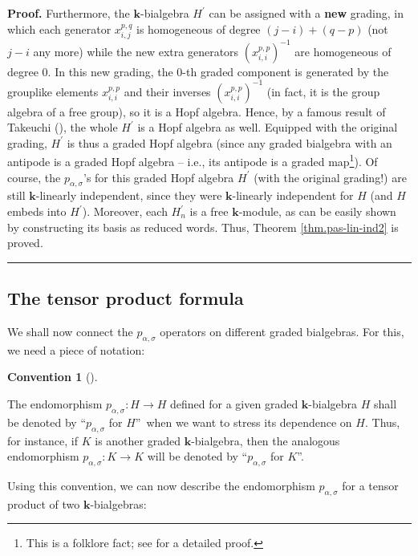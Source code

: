 \documentclass[numbers=enddot,12pt,final,onecolumn,notitlepage]{scrartcl}%
\theoremstyle{definition}
\newtheorem{conv}[theo]{Convention}
\newenvironment{convention}[1][]
{\begin{conv}[#1]\begin{leftbar}}
{\end{leftbar}\end{conv}}
\newenvironment{proof}[1][Proof]{\noindent\textbf{#1.} }{\ \rule{0.5em}{0.5em}}
\begin{document}
\begin{proof}
Furthermore, the $\mathbf{k}$-bialgebra $H^{\prime}$ can be assigned with a
\textbf{new} grading, in which each generator $x_{i,j}^{p,q}$ is homogeneous
of degree $\left(  j-i\right)  +\left(  q-p\right)  $ (not $j-i$ any more)
while the new extra generators $\left(  x_{i,i}^{p,p}\right)  ^{-1}$ are
homogeneous of degree $0$. In this new grading, the $0$-th graded component is
generated by the grouplike elements $x_{i,i}^{p,p}$ and their inverses
$\left(  x_{i,i}^{p,p}\right)  ^{-1}$ (in fact, it is the group algebra of a
free group), so it is a Hopf algebra. Hence, by a famous result of Takeuchi
(\cite[Exercise 1.4.34 (b)]{GriRei}), the whole $H^{\prime}$ is a Hopf algebra
as well. Equipped with the original grading, $H^{\prime}$ is thus a graded
Hopf algebra (since any graded bialgebra with an antipode is a graded Hopf
algebra -- i.e., its antipode is a graded map\footnote{This is a folklore
fact; see \cite[Theorem 23.2]{logid} for a detailed proof.}). Of course, the
$p_{\alpha,\sigma}$'s for this graded Hopf algebra $H^{\prime}$ (with the
original grading!) are still $\mathbf{k}$-linearly independent, since they
were $\mathbf{k}$-linearly independent for $H$ (and $H$ embeds into
$H^{\prime}$). Moreover, each $H_{n}^{\prime}$ is a free $\mathbf{k}$-module,
as can be easily shown by constructing its basis as reduced words. Thus,
Theorem \ref{thm.pas-lin-ind2} is proved.
\end{proof}

\subsection{The tensor product formula}

We shall now connect the $p_{\alpha,\sigma}$ operators on different graded
bialgebras. For this, we need a piece of notation:

\begin{convention}
\label{conv.pas-for-H}The endomorphism $p_{\alpha,\sigma}:H\rightarrow H$
defined for a given graded $\mathbf{k}$-bialgebra $H$ shall be denoted by
\textquotedblleft$p_{\alpha,\sigma}$ for $H$\textquotedblright\ when we want
to stress its dependence on $H$. Thus, for instance, if $K$ is another graded
$\mathbf{k}$-bialgebra, then the analogous endomorphism $p_{\alpha,\sigma
}:K\rightarrow K$ will be denoted by \textquotedblleft$p_{\alpha,\sigma}$ for
$K$\textquotedblright.
\end{convention}

Using this convention, we can now describe the endomorphism $p_{\alpha,\sigma
}$ for a tensor product of two $\mathbf{k}$-bialgebras:
\end{document}

